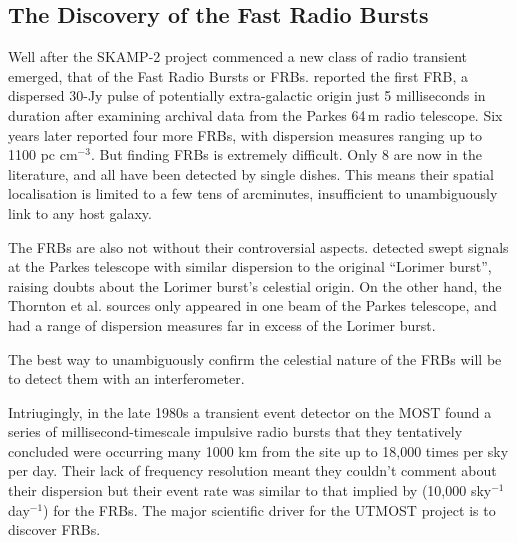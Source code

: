 \subsection{The Discovery of the Fast Radio Bursts}

Well after the SKAMP-2 project commenced a new class of radio transient emerged, that of the Fast Radio Bursts or FRBs. \cite{Lorimer_2007} reported the first FRB, a dispersed 30-Jy pulse of potentially extra-galactic origin just 5 milliseconds in duration after examining archival data from the Parkes 64\,m radio telescope. Six years later \citep{Thornton_2013} reported four more FRBs, with dispersion measures ranging up to 1100 pc cm$^{-3}$. But finding FRBs is extremely difficult. Only 8 are now in the literature, and all have been detected by single dishes. This means their spatial localisation is limited to a few tens of arcminutes, insufficient to unambiguously link to any host galaxy.

The FRBs are also not without their controversial aspects. \cite{Burke_Spolaor_2011} detected swept signals at the Parkes telescope with similar dispersion to the original ``Lorimer burst'', raising doubts about the Lorimer burst's celestial origin. On the other hand, the Thornton et al. sources only appeared in one beam of the Parkes telescope, and had a range of dispersion measures far in excess of the Lorimer burst.

The best way to unambiguously confirm the celestial nature of the FRBs will be to detect them with an interferometer.

 Intriugingly, in the late 1980s a transient event detector on the MOST found a series of millisecond-timescale impulsive radio bursts that they tentatively concluded were occurring many 1000 km from the site up to 18,000 times per sky per day\cite{AMY}. Their lack of frequency resolution meant they couldn't comment about their dispersion but their event rate was similar to that implied by \citep{Thornton_2013} (10,000 sky$^{-1}$ day$^{-1}$) for the FRBs. The major scientific driver for the UTMOST project is to discover FRBs.